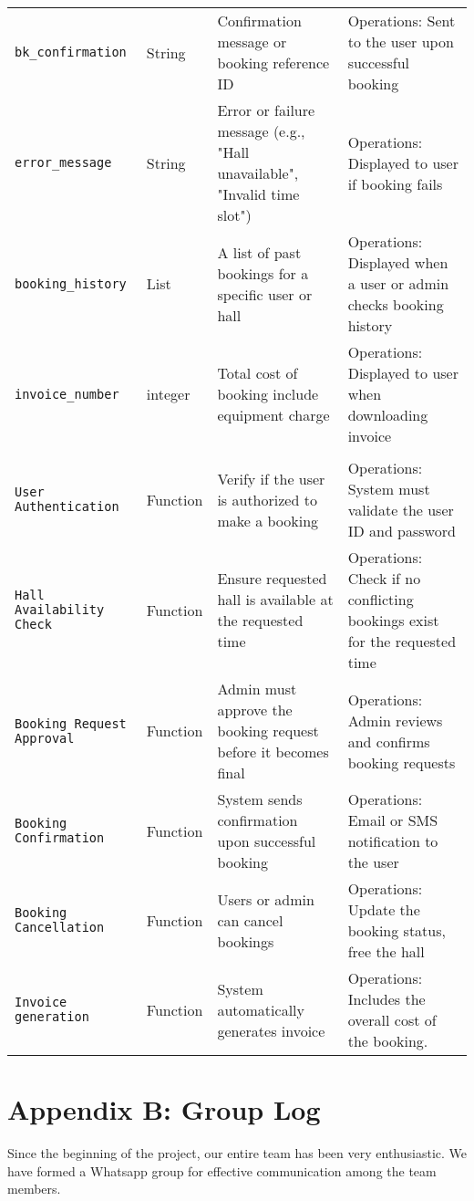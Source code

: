 \documentclass[a4paper,12pt]{article}
\begin{document}
\begin{longtable}{|>{\RaggedRight\arraybackslash}p{3.3cm}|p{2cm}|>{\RaggedRight\arraybackslash}p{5.5cm}|p{4cm}|}
    \multicolumn{4}{|c|}{\textbf{Outputs}} \\
    \hline
    \texttt{bk\_confirmation} & String & Confirmation message or booking reference ID & Operations: Sent to the user upon successful booking \\
    \hline
    \texttt{error\_message} & String & Error or failure message (e.g., "Hall unavailable", "Invalid time slot") & Operations: Displayed to user if booking fails \\
    \hline
    \texttt{booking\_history} & List & A list of past bookings for a specific user or hall & Operations: Displayed when a user or admin checks booking history \\
    \hline
    \texttt{invoice\_number} & integer & Total cost of booking include equipment charge & Operations: Displayed to user when downloading invoice \\
    \hline

    \multicolumn{4}{|c|}{\textbf{Functional Requirements}} \\
    \hline
    \texttt{User Authentication} & Function & Verify if the user is authorized to make a booking & Operations: System must validate the user ID and password \\
    \hline
    \texttt{Hall Availability Check} & Function & Ensure requested hall is available at the requested time & Operations: Check if no conflicting bookings exist for the requested time \\
    \hline
    \texttt{Booking Request Approval} & Function & Admin must approve the booking request before it becomes final & Operations: Admin reviews and confirms booking requests \\
    \hline
    \texttt{Booking Confirmation} & Function & System sends confirmation upon successful booking & Operations: Email or SMS notification to the user \\
    \hline
    \texttt{Booking Cancellation} & Function & Users or admin can cancel bookings & Operations: Update the booking status, free the hall \\
    \hline
    \texttt{Invoice generation} & Function & System automatically generates invoice & Operations: Includes the overall cost of the booking. \\
    \hline
\end{longtable}

\newpage
\section{Appendix B: Group Log}
Since the beginning of the project, our entire team has been very enthusiastic.
We have formed a Whatsapp group for effective communication among the team members.
\end{document}
